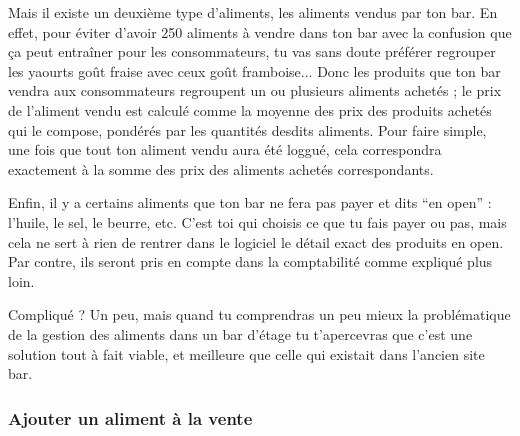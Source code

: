 \documentclass[12pt,french]{article}
\begin{document}
Mais il existe un deuxième type d'aliments, les aliments vendus par ton bar. En effet, pour éviter d'avoir 250 aliments à vendre dans ton bar avec la confusion que ça peut entraîner pour les consommateurs, tu vas sans doute préférer regrouper les yaourts goût fraise avec ceux goût framboise... Donc les produits que ton bar vendra aux consommateurs regroupent un ou plusieurs aliments achetés ; le prix de l'aliment vendu est calculé comme la moyenne des prix des produits achetés qui le compose, pondérés par les quantités desdits aliments. Pour faire simple, une fois que tout ton aliment vendu aura été loggué, cela correspondra exactement à la somme des prix des aliments achetés correspondants.

Enfin, il y a certains aliments que ton bar ne fera pas payer et dits \enquote{en open} : l'huile, le sel, le beurre, etc. C'est toi qui choisis ce que tu fais payer ou pas, mais cela ne sert à rien de rentrer dans le logiciel le détail exact des produits en open. Par contre, ils seront pris en compte dans la comptabilité comme expliqué plus loin.

Compliqué ? Un peu, mais quand tu comprendras un peu mieux la problématique de la gestion des aliments dans un bar d'étage tu t'apercevras que c'est une solution tout à fait viable, et meilleure que celle qui existait dans l'ancien site bar.

\subsubsection{Ajouter un aliment à la vente\label{ajout}}
\end{document}
